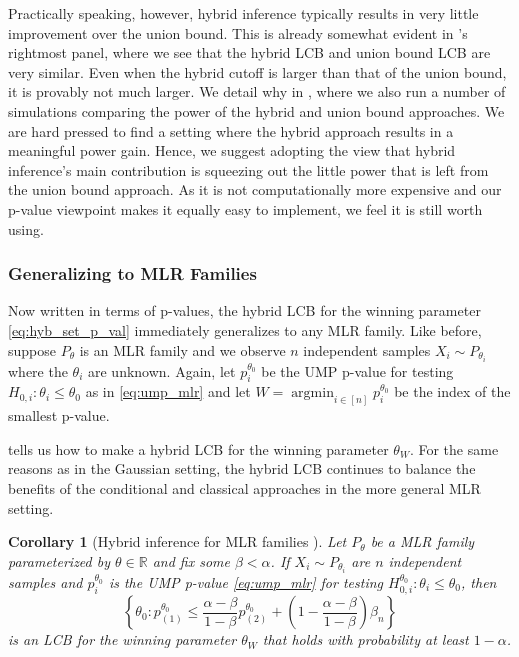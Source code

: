\documentclass{article}
\DeclareMathOperator*{\argmin}{argmin}
\newtheorem{corollary}{Corollary}
\newcommand{\R}{\mathbb{R}}
\begin{document}
Practically speaking, however, hybrid inference typically results in very little improvement over the union bound. This is already somewhat evident in 's rightmost panel, where we see that the hybrid LCB and union bound LCB are very similar. Even when the hybrid cutoff is larger than that of the union bound, it is provably not much larger. We detail why in , where we also run a number of simulations comparing the power of the hybrid and union bound approaches. We are hard pressed to find a setting where the hybrid approach results in a meaningful power gain. Hence, we suggest adopting the view that hybrid inference's main contribution is squeezing out the little power that is left from the union bound approach. As it is not computationally more expensive and our p-value viewpoint makes it equally easy to implement, we feel it is still worth using. 


\subsubsection{Generalizing to MLR Families}

Now written in terms of p-values, the hybrid LCB for the winning parameter \eqref{eq:hyb_set_p_val} immediately generalizes to any MLR family. Like before, suppose $P_{\theta}$ is an MLR family and we observe $n$ independent samples $X_i \sim P_{\theta_i}$ where the $\theta_i$ are unknown. Again, let $p^{\theta_0}_i$ be the UMP p-value for testing $H_{0, i} : \theta_i \leq  \theta_0$ as in \eqref{eq:ump_mlr} and let $W = \argmin_{i \in [n]} p^{\theta_0}_i$ be the index of the smallest p-value.

 tells us how to make a hybrid LCB for the winning parameter $\theta_W$. For the same reasons as in the Gaussian setting, the hybrid LCB continues to balance the benefits of the conditional and classical approaches in the more general MLR setting. 

\begin{corollary}[Hybrid inference for MLR families ]
    \label{cor:hyb_mlr}
    Let $P_{\theta}$ be a MLR family parameterized by $\theta \in \R$ and fix some $\beta < \alpha$. If $X_i \sim P_{\theta_i}$ are $n$ independent samples and $p^{\theta_0}_i$ is the UMP p-value \eqref{eq:ump_mlr} for testing $H^{\theta_0}_{0, i} : \theta_i \leq \theta_0 $, then 
    \begin{equation}
            \label{eq:hyb_lcb_mlr}
            \left\{\theta_0 :  p^{\theta_0}_{(1)} \leq \frac{\alpha-\beta}{1-\beta}p^{\theta_0}_{(2)}  + \left(1 - \frac{\alpha - \beta}{1 - \beta}\right) \beta_n \right\}
    \end{equation}
     is an LCB for the winning parameter $\theta_W$ that holds with probability at least $1-\alpha$. 
\end{corollary}
\end{document}
